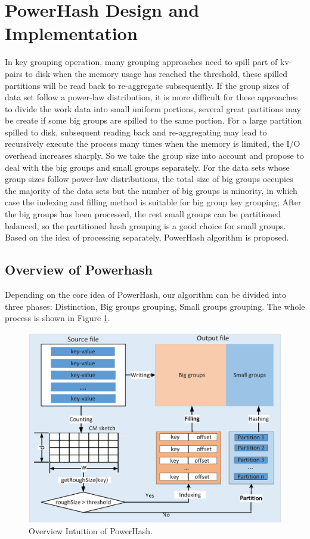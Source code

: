 \section{PowerHash Design and Implementation}
\label{sec:hash}

In key grouping operation, many grouping approaches need to spill part of kv-pairs to disk when the memory usage has reached the threshold, these spilled partitions will be read back to re-aggregate subsequently. If the group sizes of data set follow a power-law distribution, 
it is more difficult for these approaches to divide the work data into small uniform portions, several great partitions may be create if some big groups are spilled to the same portion. For a large partition spilled to disk, subsequent reading back and re-aggregating may lead to recursively execute the process many times when the memory is limited, the I/O overhead increases sharply. So we take the group size into account and propose to deal with the big groups and small groups separately. For the data sets whose group sizes follow power-law distributions, the total size of big groups occupies the majority of the data sets but the number of big groups is minority, in which case
the indexing and filling method is suitable for big group key grouping; After the big groups has been processed, the rest small groups can be partitioned balanced, so the partitioned hash grouping is a good choice for small groups. Based on the idea of processing separately, PowerHash algorithm is proposed. 

\subsection{Overview of Powerhash}%
Depending on the core idea of PowerHash, our algorithm can be divided into three phases: Distinction, Big groups grouping, Small groups grouping. The whole process is shown in Figure \ref{fig:pwHash}.
\begin{figure}
\includegraphics[width=.48\textwidth]{fig/pwhash}
\caption{Overview Intuition of PowerHash.}
\label{fig:pwHash}
\end{figure}

